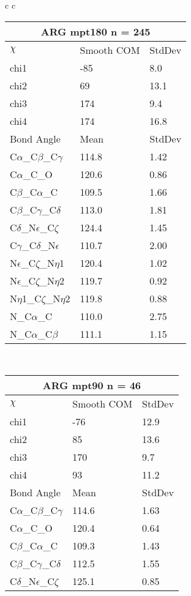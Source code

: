 \begin{longtable}{ c c }
\begin{tabular}{ l l l }
  \toprule
  \multicolumn{3}{c}{ARG \textbf{mpt180} n = 245} \\ \toprule
  $\chi$       & Smooth COM & StdDev \\ \midrule
  chi1 & -85 & 8.0 \\ 
  chi2 & 69 & 13.1 \\ 
  chi3 & 174 & 9.4 \\ 
  chi4 & 174 & 16.8 \\ \midrule
  Bond Angle   & Mean     & StdDev \\ \midrule
  C$\alpha$\_C$\beta$\_C$\gamma$ & 114.8 & 1.42\\
  C$\alpha$\_C\_O & 120.6 & 0.86\\
  C$\beta$\_C$\alpha$\_C & 109.5 & 1.66\\
  C$\beta$\_C$\gamma$\_C$\delta$ & 113.0 & 1.81\\
  C$\delta$\_N$\epsilon$\_C$\zeta$ & 124.4 & 1.45\\
  C$\gamma$\_C$\delta$\_N$\epsilon$ & 110.7 & 2.00\\
  N$\epsilon$\_C$\zeta$\_N$\eta$1 & 120.4 & 1.02\\
  N$\epsilon$\_C$\zeta$\_N$\eta$2 & 119.7 & 0.92\\
  N$\eta$1\_C$\zeta$\_N$\eta$2 & 119.8 & 0.88\\
  N\_C$\alpha$\_C & 110.0 & 2.75\\
  N\_C$\alpha$\_C$\beta$ & 111.1 & 1.15\\
  \bottomrule
  \end{tabular}
  \\
  \begin{tabular}{ l l l }
  \toprule
  \multicolumn{3}{c}{ARG \textbf{mpt90} n = 46} \\ \toprule
  $\chi$       & Smooth COM & StdDev \\ \midrule
  chi1 & -76 & 12.9 \\ 
  chi2 & 85 & 13.6 \\ 
  chi3 & 170 & 9.7 \\ 
  chi4 & 93 & 11.2 \\ \midrule
  Bond Angle   & Mean     & StdDev \\ \midrule
  C$\alpha$\_C$\beta$\_C$\gamma$ & 114.6 & 1.63\\
  C$\alpha$\_C\_O & 120.4 & 0.64\\
  C$\beta$\_C$\alpha$\_C & 109.3 & 1.43\\
  C$\beta$\_C$\gamma$\_C$\delta$ & 112.5 & 1.55\\
  C$\delta$\_N$\epsilon$\_C$\zeta$ & 125.1 & 0.85\\

\end{tabular}
\end{longtable}
